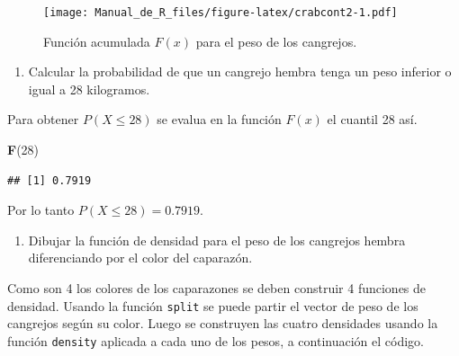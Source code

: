\documentclass[10pt,]{krantz}
\makeatletter
\newenvironment{Shaded}{\begin{snugshade}}{\end{snugshade}}
\newcommand{\KeywordTok}[1]{\textcolor[rgb]{0.13,0.29,0.53}{\textbf{#1}}}
\newcommand{\DataTypeTok}[1]{\textcolor[rgb]{0.13,0.29,0.53}{#1}}
\newcommand{\DecValTok}[1]{\textcolor[rgb]{0.00,0.00,0.81}{#1}}
\newcommand{\StringTok}[1]{\textcolor[rgb]{0.31,0.60,0.02}{#1}}
\newcommand{\OperatorTok}[1]{\textcolor[rgb]{0.81,0.36,0.00}{\textbf{#1}}}
\newcommand{\NormalTok}[1]{#1}
\providecommand{\tightlist}{%
  \setlength{\itemsep}{0pt}\setlength{\parskip}{0pt}}
\newenvironment{kframe}{%
\medskip{}
\setlength{\fboxsep}{.8em}
 \def\at@end@of@kframe{}%
 \ifinner\ifhmode%
  \def\at@end@of@kframe{\end{minipage}}%
  \begin{minipage}{\columnwidth}%
 \fi\fi%
 \def\FrameCommand##1{\hskip\@totalleftmargin \hskip-\fboxsep
 \colorbox{shadecolor}{##1}\hskip-\fboxsep
     \hskip-\linewidth \hskip-\@totalleftmargin \hskip\columnwidth}%
 \MakeFramed {\advance\hsize-\width
   \@totalleftmargin\z@ \linewidth\hsize
   \@setminipage}}%
 {\par\unskip\endMakeFramed%
 \at@end@of@kframe}
\renewenvironment{Shaded}{\begin{kframe}}{\end{kframe}}
\makeatother
\begin{document}
\begin{figure}
\centering
\texttt{[image: Manual\_de\_R\_files/figure-latex/crabcont2-1.pdf]}
\caption{\label{fig:crabcont2}Función acumulada \(F(x)\) para el peso de los
cangrejos.}
\end{figure}

\begin{enumerate}
\def\labelenumi{\arabic{enumi})}
\setcounter{enumi}{2}
\tightlist
\item
  Calcular la probabilidad de que un cangrejo hembra tenga un peso
  inferior o igual a 28 kilogramos.
\end{enumerate}

Para obtener \(P(X \leq 28)\) se evalua en la función \(F(x)\) el
cuantil 28 así.

\begin{Shaded}
\begin{Highlighting}[]
\KeywordTok{F}\NormalTok{(}\DecValTok{28}\NormalTok{)}
\end{Highlighting}
\end{Shaded}

\begin{verbatim}
## [1] 0.7919
\end{verbatim}

Por lo tanto \(P(X \leq 28)=0.7919\).

\begin{enumerate}
\def\labelenumi{\arabic{enumi})}
\setcounter{enumi}{3}
\tightlist
\item
  Dibujar la función de densidad para el peso de los cangrejos hembra
  diferenciando por el color del caparazón.
\end{enumerate}

Como son 4 los colores de los caparazones se deben construir 4 funciones
de densidad. Usando la función \texttt{split} se puede partir el vector
de peso de los cangrejos según su color. Luego se construyen las cuatro
densidades usando la función \texttt{density} aplicada a cada uno de los
pesos, a continuación el código.

\begin{Shaded}
\end{Shaded}
\end{document}
